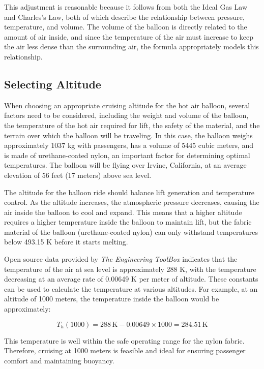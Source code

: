 \documentclass{article}
\begin{document}
This adjustment is reasonable because it follows from both the Ideal Gas Law and Charles’s Law, both of which describe the relationship between pressure, temperature, and volume. The volume of the balloon is directly related to the amount of air inside, and since the temperature of the air must increase to keep the air less dense than the surrounding air, the formula appropriately models this relationship.





\subsection*{Selecting Altitude}
When choosing an appropriate cruising altitude for the hot air balloon, several factors need to be considered, including the weight and volume of the balloon, the temperature of the hot air required for lift, the safety of the material, and the terrain over which the balloon will be traveling. In this case, the balloon weighs approximately 1037 kg with passengers, has a volume of 5445 cubic meters, and is made of urethane-coated nylon, an important factor for determining optimal temperatures. The balloon will be flying over Irvine, California, at an average elevation of 56 feet (17 meters) above sea level.

The altitude for the balloon ride should balance lift generation and temperature control. As the altitude increases, the atmospheric pressure decreases, causing the air inside the balloon to cool and expand. This means that a higher altitude requires a higher temperature inside the balloon to maintain lift, but the fabric material of the balloon (urethane-coated nylon) can only withstand temperatures below 493.15 K before it starts melting.

Open source data provided by \textit{The Engineering ToolBox} indicates that the temperature of the air at sea level is approximately 288 K, with the temperature decreasing at an average rate of 0.00649 K per meter of altitude. These constants can be used to calculate the temperature at various altitudes. For example, at an altitude of 1000 meters, the temperature inside the balloon would be approximately:

\[
T_h(1000) = 288 \, \text{K} - 0.00649 \times 1000 = 284.51 \, \text{K}
\]

This temperature is well within the safe operating range for the nylon fabric. Therefore, cruising at 1000 meters is feasible and ideal for ensuring passenger comfort and maintaining buoyancy.
\end{document}
